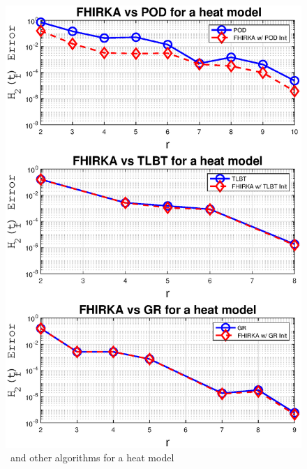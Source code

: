 \documentclass[twocolumn]{autart}
\begin{document}
 \begin{figure}[H] 
 \centering
 \includegraphics [scale=0.35]{fig1h} 
 \caption{\FH \ and other algorithms for a heat model\label{fig:hm}}
 \end{figure}
\end{document}
